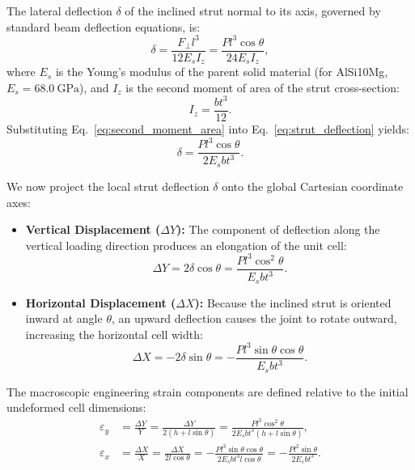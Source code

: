 The lateral deflection $\delta$ of the inclined strut normal to its axis, governed by standard beam deflection equations, is:
\begin{equation}
\delta = \frac{F_\perp l^3}{12 E_s I_z} = \frac{P l^3 \cos\theta}{24 E_s I_z},
\label{eq:strut_deflection}
\end{equation}
where $E_s$ is the Young's modulus of the parent solid material (for AlSi10Mg, $E_s = \SI{68.0}{\giga\pascal}$), and $I_z$ is the second moment of area of the strut cross-section:
\begin{equation}
I_z = \frac{b t^3}{12}.
\label{eq:second_moment_area}
\end{equation}
Substituting Eq.~\eqref{eq:second_moment_area} into Eq.~\eqref{eq:strut_deflection} yields:
\begin{equation}
\delta = \frac{P l^3 \cos\theta}{2 E_s b t^3}.
\label{eq:deflection_explicit}
\end{equation}

We now project the local strut deflection $\delta$ onto the global Cartesian coordinate axes:
\begin{itemize}
\item \textbf{Vertical Displacement ($\Delta Y$):} The component of deflection along the vertical loading direction produces an elongation of the unit cell:
\begin{equation}
\Delta Y = 2 \delta \cos\theta = \frac{P l^3 \cos^2\theta}{E_s b t^3}.
\label{eq:delta_y}
\end{equation}
\item \textbf{Horizontal Displacement ($\Delta X$):} Because the inclined strut is oriented inward at angle $\theta$, an upward deflection causes the joint to rotate outward, increasing the horizontal cell width:
\begin{equation}
\Delta X = -2 \delta \sin\theta = -\frac{P l^3 \sin\theta \cos\theta}{E_s b t^3}.
\label{eq:delta_x}
\end{equation}
\end{itemize}

The macroscopic engineering strain components are defined relative to the initial undeformed cell dimensions:
\begin{align}
\varepsilon_y &= \frac{\Delta Y}{Y} = \frac{\Delta Y}{2(h + l \sin\theta)} = \frac{P l^3 \cos^2\theta}{2 E_s b t^3 (h + l \sin\theta)}, \label{eq:strain_y} \\
\varepsilon_x &= \frac{\Delta X}{X} = \frac{\Delta X}{2 l \cos\theta} = -\frac{P l^3 \sin\theta \cos\theta}{2 E_s b t^3 l \cos\theta} = -\frac{P l^2 \sin\theta}{2 E_s b t^3}. \label{eq:strain_x}
\end{align}

